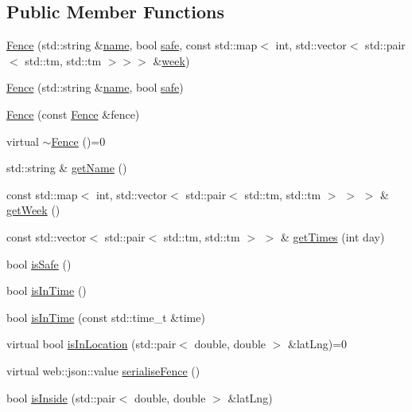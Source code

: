 \subsection*{Public Member Functions}
\begin{DoxyCompactItemize}
\item 
\hyperlink{class_fence_a5c2be718e885ed9ae2ca048406d126b3}{Fence} (std\+::string \&\hyperlink{class_fence_aa405676733f25812b38ea0dd9ccd1863}{name}, bool \hyperlink{class_fence_ad570430040eee657c625a67d5589c4b5}{safe}, const std\+::map$<$ int, std\+::vector$<$ std\+::pair$<$ std\+::tm, std\+::tm $>$$>$$>$ \&\hyperlink{class_fence_ae589e973fa03316847aeceedd72e2b64}{week})
\item 
\hyperlink{class_fence_ae67f4594ce0f96eda5cb02df41fcf45a}{Fence} (std\+::string \&\hyperlink{class_fence_aa405676733f25812b38ea0dd9ccd1863}{name}, bool \hyperlink{class_fence_ad570430040eee657c625a67d5589c4b5}{safe})
\item 
\hyperlink{class_fence_a3fdfc7240f1e938dab4c9534c63aa427}{Fence} (const \hyperlink{class_fence}{Fence} \&fence)
\item 
virtual \hyperlink{class_fence_a6c5e019535f94462bfab1ad19b865c55}{$\sim$\+Fence} ()=0
\item 
std\+::string \& \hyperlink{class_fence_a1d90d0ff61bec6cda8240f6365fc5d28}{get\+Name} ()
\item 
const std\+::map$<$ int, std\+::vector$<$ std\+::pair$<$ std\+::tm, std\+::tm $>$ $>$ $>$ \& \hyperlink{class_fence_a533d7eaba8b2d6774ec2c9dce05145eb}{get\+Week} ()
\item 
const std\+::vector$<$ std\+::pair$<$ std\+::tm, std\+::tm $>$ $>$ \& \hyperlink{class_fence_a818ee0fcbac0c2f9262a48916a79d73c}{get\+Times} (int day)
\item 
bool \hyperlink{class_fence_a4f0626e3b3189b6ab1c505c92952bcb2}{is\+Safe} ()
\item 
bool \hyperlink{class_fence_a7695b0f94f461369703188a287a38ab4}{is\+In\+Time} ()
\item 
bool \hyperlink{class_fence_a9d1d90f134dceb2168247cd8454d91f4}{is\+In\+Time} (const std\+::time\+\_\+t \&time)
\item 
virtual bool \hyperlink{class_fence_a80fb7fbb60592d3e8afc0ecb5122b987}{is\+In\+Location} (std\+::pair$<$ double, double $>$ \&lat\+Lng)=0
\item 
virtual web\+::json\+::value \hyperlink{class_fence_a5c8529e80a4444cc9ca0fb660cbf07c8}{serialise\+Fence} ()
\item 
bool \hyperlink{class_fence_a224ef2ce3f97de067f996b4722c66797}{is\+Inside} (std\+::pair$<$ double, double $>$ \&lat\+Lng)
\end{DoxyCompactItemize}
